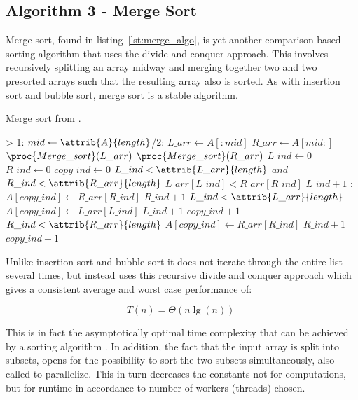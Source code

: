 \documentclass[sigconf, nonacm, natbib, screen, balance=False]{acmart}
\begin{document}
\subsection{Algorithm 3 - Merge Sort}\label{sec:algo3}

Merge sort, found in listing~\ref{lst:merge_algo}, is yet another comparison-based sorting algorithm that uses the divide-and-conquer approach. This involves recursively splitting an array midway and merging together two and two presorted arrays such that the resulting array also is sorted. As with insertion sort and bubble sort, merge sort is a stable algorithm.
\begin{listing}
  \caption{Merge sort from \citet[Ch.~2.3, p.31]{CLRS_2009}.}
  \label{lst:merge_algo}

  \begin{codebox}
    \li \If {} > 1: 
    \li \Do
    $mid \gets \attrib{A}{length}$/2: 
    \li $L\_arr\gets A[:mid]$
    \li $R\_arr\gets A[mid:]$
    \li $\proc{Merge\_sort}(L\_arr)$
    \li $\proc{Merge\_sort}(R\_arr)$
    \li $L\_ind\gets 0$
    \li $R\_ind\gets 0$
    \li $copy\_ind\gets 0$
    \li \While $L\_ind < \attrib{L\_arr}{length}$ $and$ $R\_ind < \attrib{R\_arr}{length}$ 
    \li \Do
    \If $L\_arr[L\_ind] < R\_arr[R\_ind]$
    \li \Do
    $L\_ind + 1$
    \li \Else:
    \li $A[copy\_ind] \gets R\_arr[R\_ind]$
    \li $R\_ind + 1$
    \End
    \End
    \li \While $L\_ind < \attrib{L\_arr}{length}$
    \li \Do
    $A[copy\_ind] \gets L\_arr[L\_ind]$
    \li $L\_ind + 1$
    \li $copy\_ind + 1$
    \End
    \li \While $R\_ind < \attrib{R\_arr}{length}$
    \li \Do
    $A[copy\_ind] \gets R\_arr[R\_ind]$
    \li $R\_ind + 1$
    \li $copy\_ind + 1$    
  \end{codebox}
\end{listing}

Unlike insertion sort and bubble sort it does not iterate through the entire list several times, but instead uses this recursive divide and conquer approach which gives a consistent average and worst case performance of: 

\begin{equation}
  T(n) = \Theta(n\lg(n)) \;  \label{eq:merge_sort_best}
\end{equation}

This is in fact the asymptotically optimal time complexity that can be achieved by a sorting algorithm \citet[Ch.~8.0]{CLRS_2009}. In addition, the fact that the input array is split into subsets, opens for the possibility to sort the two subsets simultaneously, also called to parallelize. This in turn decreases the constants not for computations, but for runtime in accordance to number of workers (threads) chosen. 
\end{document}
